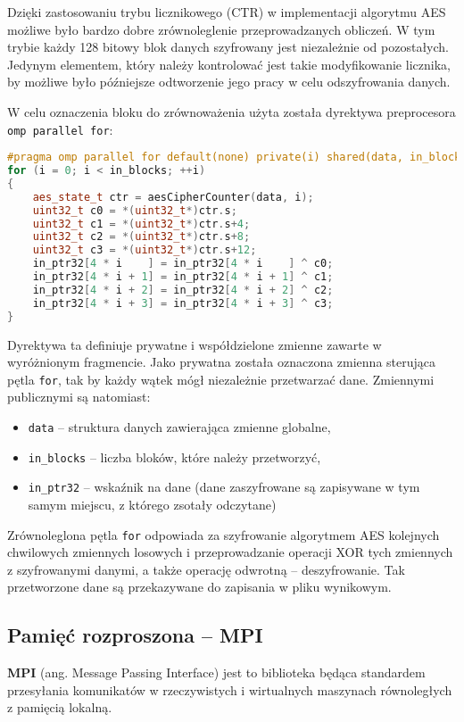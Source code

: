 \documentclass[a4paper,12pt]{article}
\begin{document}
Dzięki zastosowaniu trybu licznikowego (CTR) w implementacji algorytmu AES możliwe było bardzo dobre zrównoleglenie przeprowadzanych obliczeń. W tym trybie każdy 128 bitowy blok danych szyfrowany jest niezależnie od pozostałych. Jedynym elementem, który należy kontrolować jest takie modyfikowanie licznika, by możliwe było późniejsze odtworzenie jego pracy w celu odszyfrowania danych.

W celu oznaczenia bloku do zrównoważenia użyta została dyrektywa preprocesora \texttt{omp parallel for}:
\begin{lstlisting}[language=c++]
#pragma omp parallel for default(none) private(i) shared(data, in_blocks, in_ptr32)
for (i = 0; i < in_blocks; ++i)
{
	aes_state_t ctr = aesCipherCounter(data, i);
	uint32_t c0 = *(uint32_t*)ctr.s;
	uint32_t c1 = *(uint32_t*)ctr.s+4;
	uint32_t c2 = *(uint32_t*)ctr.s+8;
	uint32_t c3 = *(uint32_t*)ctr.s+12;
	in_ptr32[4 * i    ] = in_ptr32[4 * i    ] ^ c0;
	in_ptr32[4 * i + 1] = in_ptr32[4 * i + 1] ^ c1;
	in_ptr32[4 * i + 2] = in_ptr32[4 * i + 2] ^ c2;
	in_ptr32[4 * i + 3] = in_ptr32[4 * i + 3] ^ c3;
}
\end{lstlisting}

Dyrektywa ta definiuje prywatne i współdzielone zmienne zawarte w wyróżnionym fragmencie. Jako prywatna została oznaczona zmienna sterująca pętla \texttt{for}, tak by każdy wątek mógł niezależnie przetwarzać dane. Zmiennymi publicznymi są natomiast:
\begin{itemize}
\item \texttt{data} -- struktura danych zawierająca zmienne globalne,
\item \texttt{in\_blocks} -- liczba bloków, które należy przetworzyć,
\item \texttt{in\_ptr32} -- wskaźnik na dane (dane zaszyfrowane są zapisywane w tym samym miejscu, z którego zsotały odczytane)
\end{itemize}

Zrównoleglona pętla \texttt{for} odpowiada za szyfrowanie algorytmem AES kolejnych 
chwilowych zmiennych losowych i przeprowadzanie operacji XOR tych zmiennych 
z szyfrowanymi danymi, a także operację odwrotną -- deszyfrowanie. Tak 
przetworzone dane są przekazywane do zapisania w pliku wynikowym.

\subsection{Pamięć rozproszona -- MPI}
\textbf{MPI} (ang. Message Passing Interface) jest to biblioteka będąca 
standardem przesyłania komunikatów w rzeczywistych i wirtualnych maszynach 
równoległych z pamięcią lokalną.
\end{document}
